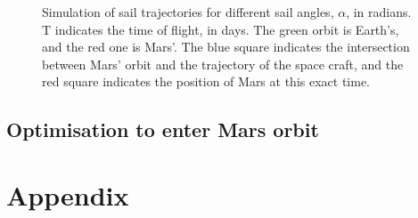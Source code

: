 \documentclass[twocolumn,12pt,a4paper]{article}
\numberwithin{equation}{section}
\begin{document}
\begin{figure}
	\caption{Simulation of sail trajectories for different sail angles, $\alpha$, in radians. T indicates the time of flight, in days. The green orbit is Earth's, and the red one is Mars'. The blue square indicates the intersection between Mars' orbit and the trajectory of the space craft, and the red square indicates the position of Mars at this exact time. }
	\label{fig:espirals}
\end{figure}
\subsection{Optimisation to enter Mars orbit}

\clearpage




\section*{Appendix}
\end{document}

